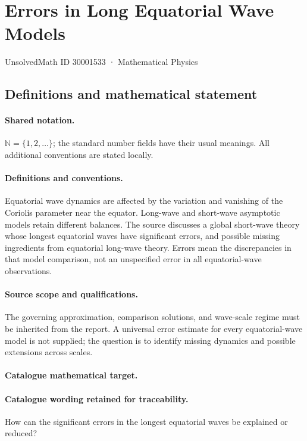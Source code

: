 \documentclass[11pt]{article}
\begin{document}
\setcounter{section}{30001532}
\section{Errors in Long Equatorial Wave Models}\label{30001533}
{\small UnsolvedMath ID 30001533 · Mathematical Physics}
\subsection{Definitions and mathematical statement}

\paragraph{Shared notation.}$\mathbb N=\{1,2,\ldots\}$; the standard number fields have their usual meanings. All additional conventions are stated locally.


\paragraph{Definitions and conventions.} Equatorial wave dynamics are affected by the variation and vanishing of the Coriolis parameter near the equator. Long-wave and short-wave asymptotic models retain different balances. The source discusses a global short-wave theory whose longest equatorial waves have significant errors, and possible missing ingredients from equatorial long-wave theory. Errors mean the discrepancies in that model comparison, not an unspecified error in all equatorial-wave observations.

\paragraph{Source scope and qualifications.} The governing approximation, comparison solutions, and wave-scale regime must be inherited from the report. A universal error estimate for every equatorial-wave model is not supplied; the question is to identify missing dynamics and possible extensions across scales.

\paragraph{Catalogue mathematical target.}
\paragraph{Catalogue wording retained for traceability.}
How can the significant errors in the longest equatorial waves be explained or reduced?
\end{document}
